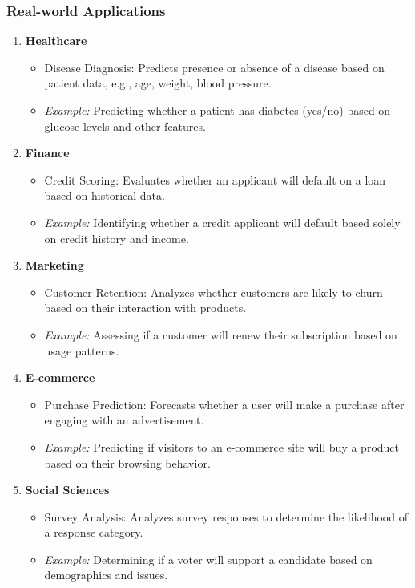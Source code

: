 \documentclass[aspectratio=169]{beamer}
\begin{document}
\begin{frame}[fragile]
    \frametitle{Real-world Applications}
    \begin{enumerate}
        \item \textbf{Healthcare}
            \begin{itemize}
                \item Disease Diagnosis: Predicts presence or absence of a disease based on patient data, e.g., age, weight, blood pressure.
                \item \textit{Example:} Predicting whether a patient has diabetes (yes/no) based on glucose levels and other features.
            \end{itemize}
        \item \textbf{Finance}
            \begin{itemize}
                \item Credit Scoring: Evaluates whether an applicant will default on a loan based on historical data.
                \item \textit{Example:} Identifying whether a credit applicant will default based solely on credit history and income.
            \end{itemize}
        \item \textbf{Marketing}
            \begin{itemize}
                \item Customer Retention: Analyzes whether customers are likely to churn based on their interaction with products.
                \item \textit{Example:} Assessing if a customer will renew their subscription based on usage patterns.
            \end{itemize}
        \item \textbf{E-commerce}
            \begin{itemize}
                \item Purchase Prediction: Forecasts whether a user will make a purchase after engaging with an advertisement.
                \item \textit{Example:} Predicting if visitors to an e-commerce site will buy a product based on their browsing behavior.
            \end{itemize}
        \item \textbf{Social Sciences}
            \begin{itemize}
                \item Survey Analysis: Analyzes survey responses to determine the likelihood of a response category.
                \item \textit{Example:} Determining if a voter will support a candidate based on demographics and issues.
            \end{itemize}
    \end{enumerate}
\end{frame}
\end{document}
